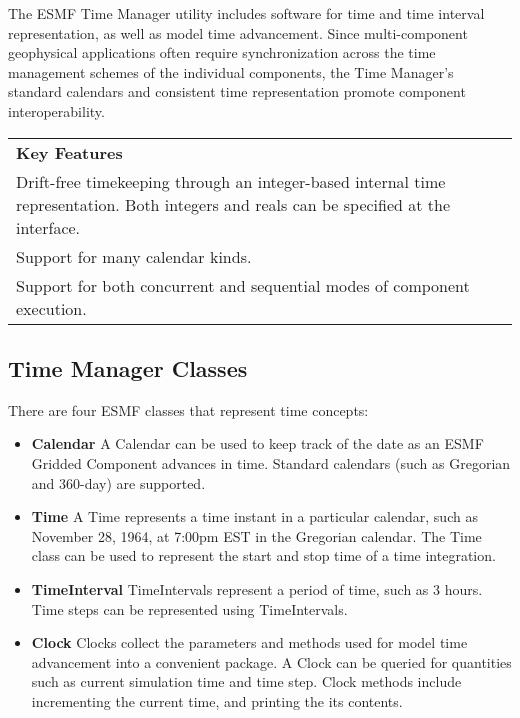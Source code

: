 
The ESMF Time Manager utility includes software for time and time interval 
representation, as well as model time advancement. Since multi-component 
geophysical applications often require synchronization across 
the time management schemes of the individual components, the 
Time Manager's standard calendars and consistent time representation 
promote component interoperability.
\begin{center}  
\begin{tabular}{|p{6in}|}
\hline
\vspace{.01in}
{\bf Key Features} \\[.01in]
Drift-free timekeeping through an integer-based internal time 
representation.  Both integers and reals can be specified at the interface. \\
Support for many calendar kinds. \\
Support for both concurrent and sequential modes of component execution. \\[.03in] \hline
\end{tabular}
\end{center}

\subsection{Time Manager Classes}
There are four ESMF classes that represent time concepts:
\begin{itemize}
\item {\bf Calendar}  A Calendar can be used to keep track of the 
date as an ESMF Gridded Component advances in time. Standard calendars 
(such as Gregorian and 360-day) are supported. 
\item {\bf Time} A Time represents a time instant in a particular 
calendar, such as November 28, 1964, at 7:00pm EST in the Gregorian 
calendar.  The Time class can be used 
to represent the start and stop time of a time integration.
\item {\bf TimeInterval} TimeIntervals represent a period 
of time, such as 3 hours.  Time steps can be represented 
using TimeIntervals. 
\item {\bf Clock} Clocks collect the parameters and 
methods used for model time advancement into a convenient 
package.  A Clock can be queried for quantities such 
as current simulation time and time step.  Clock methods 
include incrementing the current time, and printing the its contents.
\end{itemize}

